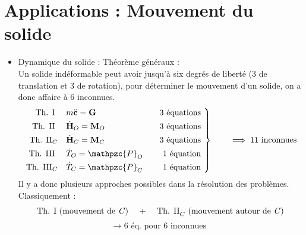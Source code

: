 \documentclass[a4paper]{article}
\begin{document}
\section{Applications : Mouvement du solide}










\begin{itemize}





\item Dynamique du solide : Théorème généraux : \\
Un solide indéformable peut avoir jusqu'à six degrés de liberté (3 de translation et 3 de rotation), pour déterminer le mouvement d'un solide, on a donc affaire à 6 inconnues.
\[
\left.\begin{aligned}
\text{ Th. I } \quad & m \ddot{\textbf{c}} = \textbf{G} \quad & 3 \text{ équations } \\
\text{ Th. II } \quad & \dot{\textbf{H}}_O = \textbf{M}_O \quad & 3 \text{ équations } \\
\text{ Th. II}_C \quad & \dot{\textbf{H}}_C = \textbf{M}_C \quad & 3 \text{ équations } \\
\text{ Th. III } \quad & \dot{T}_O = \mathpzc{P}_O \quad & 1 \text{ équation } \\
\text{ Th. III}_C \quad & \dot{T}_C = \mathpzc{P}_C \quad & 1 \text{ équation }
\end{aligned}\right\rbrace \qquad \implies 11 \text{ inconnues }
\]
Il y a donc plusieurs approches possibles dans la résolution des problèmes. \\
Classiquement : 
\[ \text{ Th. I (mouvement de \emph{C}) \quad + \quad Th. II}_C \text{ (mouvement autour de \emph{C}) }  \]
\[ \longrightarrow \text{ 6 éq. pour 6 inconnues } \]






\end{itemize}
\end{document}
